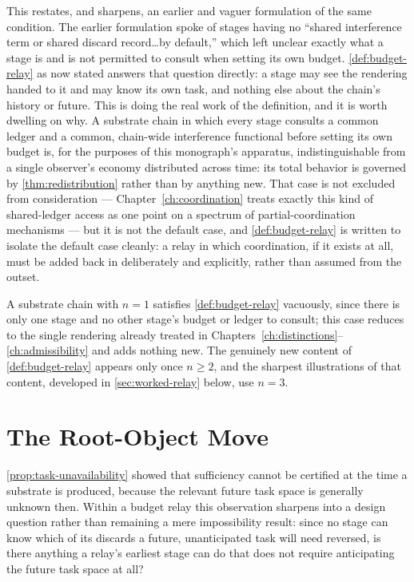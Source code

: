 This restates, and sharpens, an earlier and vaguer formulation of the same
condition. The earlier formulation spoke of stages having no ``shared
interference term or shared discard record\ldots by default,'' which left
unclear exactly what a stage is and is not permitted to consult when
setting its own budget. \cref{def:budget-relay} as now stated answers that
question directly: a stage may see the rendering handed to it and may know
its own task, and nothing else about the chain's history or future. This
is doing the real work of the definition, and it is worth dwelling on why.
A substrate chain in which every stage consults a common ledger and a
common, chain-wide interference functional before setting its own budget
is, for the purposes of this monograph's apparatus, indistinguishable from
a single observer's economy distributed across time: its total behavior is
governed by \cref{thm:redistribution} rather than by anything new. That
case is not excluded from consideration --- Chapter~\ref{ch:coordination}
treats exactly this kind of shared-ledger access as one point on a
spectrum of partial-coordination mechanisms --- but it is not the default
case, and \cref{def:budget-relay} is written to isolate the default case
cleanly: a relay in which coordination, if it exists at all, must be added
back in deliberately and explicitly, rather than assumed from the outset.

\begin{remark}
\label{rem:degenerate-relay}
A substrate chain with $n = 1$ satisfies \cref{def:budget-relay} vacuously,
since there is only one stage and no other stage's budget or ledger to
consult; this case reduces to the single rendering already treated in
Chapters~\ref{ch:distinctions}--\ref{ch:admissibility} and adds nothing new.
The genuinely new content of \cref{def:budget-relay} appears only once
$n \ge 2$, and the sharpest illustrations of that content, developed in
\cref{sec:worked-relay} below, use $n = 3$.
\end{remark}

\section{The Root-Object Move}

\cref{prop:task-unavailability} showed that sufficiency cannot be
certified at the time a substrate is produced, because the relevant future
task space is generally unknown then. Within a budget relay this
observation sharpens into a design question rather than remaining a mere
impossibility result: since no stage can know which of its discards a
future, unanticipated task will need reversed, is there anything a relay's
earliest stage can do that does not require anticipating the future task
space at all?

